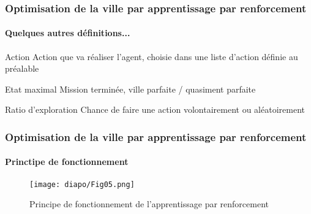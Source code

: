

\begin{frame}
	\frametitle{Optimisation de la ville par apprentissage par renforcement}
	\framesubtitle{Quelques autres définitions...}
\pause
\begin{exampleblock}{Action}
    Action que va réaliser l'agent, choisie dans une liste d'action définie au préalable
\end{exampleblock}
\pause
\begin{exampleblock}{Etat maximal}
    Mission terminée, ville parfaite / quasiment parfaite
\end{exampleblock}
\pause
\begin{exampleblock}{Ratio d'exploration}
Chance de faire une action volontairement ou aléatoirement
    
\end{exampleblock}
\end{frame}




\begin{frame}
	\frametitle{Optimisation de la ville par apprentissage par renforcement}
	\framesubtitle{Princtipe de fonctionnement}
\begin{figure}
\texttt{[image: diapo/Fig05.png]}\\
\caption{Principe de fonctionnement de l'apprentissage par renforcement}
\end{figure}
\end{frame}

